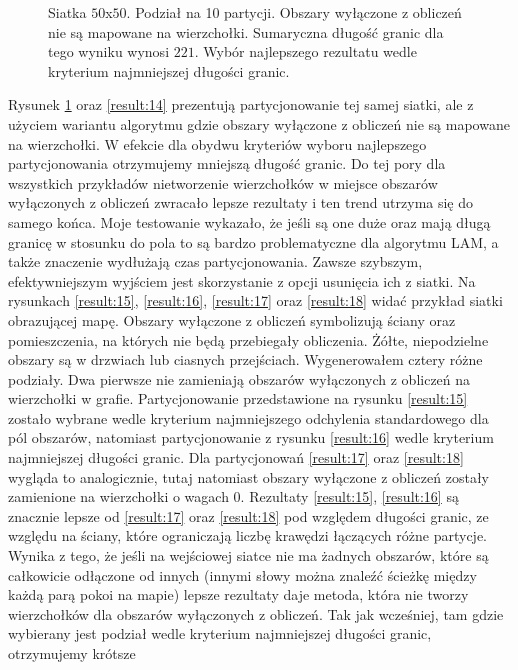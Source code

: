 \begin{figure}[h]
\begin{subfigure}{.33\textwidth}
    \caption[short]{}
\end{subfigure}
\caption{Siatka $50$x$50$. Podział na 10 partycji.
Obszary wyłączone z obliczeń nie są mapowane na wierzchołki.
Sumaryczna długość granic dla tego wyniku wynosi $221$.
Wybór najlepszego rezultatu wedle kryterium najmniejszej długości granic.}
\label{result:13}
\end{figure}
Rysunek \ref{result:13} oraz \ref{result:14} prezentują partycjonowanie tej samej siatki, ale z użyciem wariantu algorytmu
gdzie obszary wyłączone z obliczeń nie są mapowane na wierzchołki.
W efekcie dla obydwu kryteriów wyboru najlepszego partycjonowania otrzymujemy mniejszą długość granic.
Do tej pory dla wszystkich przykładów nietworzenie wierzchołków w miejsce obszarów wyłączonych z obliczeń
zwracało lepsze rezultaty i ten trend utrzyma się do samego końca.
Moje testowanie wykazało, że jeśli są one duże oraz mają długą granicę w stosunku do pola to są bardzo
problematyczne dla algorytmu LAM, a także znaczenie wydłużają czas partycjonowania.
Zawsze szybszym, efektywniejszym wyjściem jest skorzystanie z opcji usunięcia ich z siatki.
\FloatBarrier
\vspace{4mm}
Na rysunkach \ref{result:15}, \ref{result:16}, \ref{result:17} oraz \ref{result:18} widać przykład siatki obrazującej
mapę.
Obszary wyłączone z obliczeń symbolizują ściany oraz pomieszczenia, na których nie będą przebiegały obliczenia.
Żółte, niepodzielne obszary są w drzwiach lub ciasnych przejściach.
Wygenerowałem cztery różne podziały.
Dwa pierwsze nie zamieniają obszarów wyłączonych z obliczeń na wierzchołki w grafie.
Partycjonowanie przedstawione na rysunku \ref{result:15} zostało wybrane wedle kryterium najmniejszego odchylenia standardowego dla pól obszarów,
natomiast partycjonowanie z rysunku \ref{result:16} wedle kryterium najmniejszej długości granic.
Dla partycjonowań \ref{result:17} oraz \ref{result:18} wygląda to analogicznie, tutaj natomiast obszary wyłączone z obliczeń
zostały zamienione na wierzchołki o wagach $0$.
Rezultaty \ref{result:15}, \ref{result:16} są znacznie lepsze od \ref{result:17} oraz \ref{result:18} pod względem
długości granic, ze względu na ściany, które ograniczają liczbę krawędzi łączących różne partycje.
Wynika z tego, że jeśli na wejściowej siatce nie ma żadnych obszarów, które są całkowicie odłączone od innych
(innymi słowy można znaleźć ścieżkę między każdą parą pokoi na mapie)
lepsze rezultaty daje metoda, która nie tworzy wierzchołków dla obszarów wyłączonych z obliczeń.
Tak jak wcześniej, tam gdzie wybierany jest podział wedle kryterium najmniejszej długości granic, otrzymujemy krótsze
